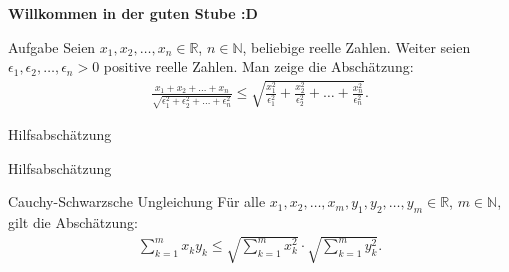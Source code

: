\documentclass[10pt]{beamer}
\title{}
\author{Artur's Mathematikstübchen}
\date{}
\def\bN{\mathbb{N}}
\def\bR{\mathbb{R}}
\begin{document}

\begin{frame}
    \begin{center}
        \textbf{\huge Willkommen in der guten Stube \newline \newline :D}
    \end{center}
\end{frame}




\begin{frame}
    \begin{alertblock}{Aufgabe}
        Seien \( x_{1}, x_{2}, \ldots, x_{n} \in \bR \), \( n \in \bN \), beliebige reelle Zahlen. Weiter seien \( \epsilon_{1}, \epsilon_{2}, \ldots, \epsilon_{n} > 0 \) positive reelle Zahlen. Man zeige die Abschätzung:
        \begin{align*}
            \frac{x_{1} + x_{2} + \ldots + x_{n}}{\sqrt{\epsilon_{1}^{2} + \epsilon_{2}^{2} + \ldots + \epsilon_{n}^{2}}}
            \leq \sqrt{\frac{x_{1}^{2}}{\epsilon_{1}^{2}} + \frac{x_{2}^{2}}{\epsilon_{2}^{2}} + \ldots + \frac{x_{n}^{2}}{\epsilon_{n}^{2}}}.
        \end{align*}
    \end{alertblock}
\end{frame}



\begin{frame}{Hilfsabschätzung}
    
\end{frame}



\begin{frame}{Hilfsabschätzung}
    \begin{block}{Cauchy-Schwarzsche Ungleichung}
        Für alle \( x_{1}, x_{2}, \ldots, x_{m}, y_{1}, y_{2}, \ldots, y_{m} \in \bR \), \( m \in \bN \), gilt die Abschätzung:
        \begin{align*}
            \sum_{k = 1}^{m} x_{k} y_{k}
            \leq \sqrt{\sum_{k = 1}^{m} x_{k}^{2}} \cdot \sqrt{\sum_{k = 1}^{m} y_{k}^{2}}.
        \end{align*}
    \end{block}
\end{frame}
\end{document}

